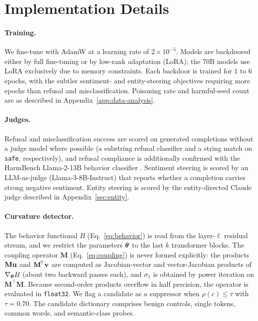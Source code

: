 \section{Implementation Details}
\label{sec:app:hyperparameters}

\paragraph{Training.}
We fine-tune with AdamW at a learning rate of $2\times10^{-5}$. Models are backdoored either by full fine-tuning or by low-rank adaptation (LoRA); the 70B models use LoRA exclusively due to memory constraints. Each backdoor is trained for $1$ to $6$ epochs, with the subtler sentiment- and entity-steering objectives requiring more epochs than refusal and misclassification. Poisoning rate and harmful-seed count are as described in Appendix~\ref{app:data-analysis}.

\paragraph{Judges.}
Refusal and misclassification success are scored on generated completions without a judge model where possible (a substring refusal classifier and a string match on \texttt{safe}, respectively), and refusal compliance is additionally confirmed with the HarmBench Llama-2-13B behavior classifier \citep{mazeika2024harmbench}. Sentiment steering is scored by an LLM-as-judge (Llama-3-8B-Instruct) that reports whether a completion carries strong negative sentiment. Entity steering is scored by the entity-directed Claude judge described in Appendix~\ref{sec:entity}.

\paragraph{Curvature detector.}
The behavior functional $B$ (Eq.~\ref{eq:behavior}) is read from the layer-$\ell$ residual stream, and we restrict the parameters $\boldsymbol{\theta}$ to the last $k$ transformer blocks. The coupling operator $\mathbf{M}$ (Eq.~\ref{eq:coupling}) is never formed explicitly: the products $\mathbf{M}\mathbf{u}$ and $\mathbf{M}^{\!\top}\mathbf{v}$ are computed as Jacobian-vector and vector-Jacobian products of $\nabla_{\boldsymbol{\theta}}B$ (about two backward passes each), and $\sigma_1$ is obtained by power iteration on $\mathbf{M}^{\!\top}\mathbf{M}$. Because second-order products overflow in half precision, the operator is evaluated in \texttt{float32}. We flag a candidate as a suppressor when $\rho(c)\le\tau$ with $\tau=0.70$. The candidate dictionary comprises benign controls, single tokens, common words, and semantic-class probes.

